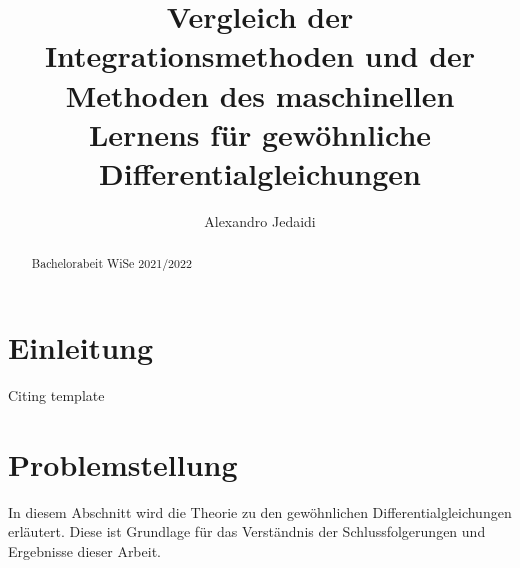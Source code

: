 \documentclass[
    paper=a4, %
    fontsize=12pt,  %
    oneside,        %
    headsepline,    %
    notitlepage     %
]{extarticle}         %
\author{Alexandro Jedaidi}
\title{\textbf{Vergleich der Integrationsmethoden und der Methoden des maschinellen Lernens für gewöhnliche Differentialgleichungen}}
\date{}
\begin{document}
    \maketitle
    \tableofcontents
    \newpage
    \begin{abstract}
        Bachelorabeit WiSe 2021/2022
    \end{abstract}
    \pagestyle{headings}

    \section{Einleitung}
    Citing template\cite{Google}

    \section{Problemstellung}
    In diesem Abschnitt wird die Theorie zu den gewöhnlichen Differentialgleichungen erläutert. Diese ist Grundlage für
    das Verständnis der Schlussfolgerungen und Ergebnisse dieser Arbeit.
\end{document}
